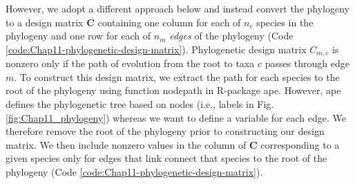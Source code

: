 However, we adopt a different approach below and instead convert the phylogeny to a design matrix \( \mathbf{C} \) containing one column for each of \(n_c\) species in the phylogeny and one row for each of \(n_m\) \textit{edges} of the phylogeny (Code \ref{code:Chap11-phylogenetic-design-matrix}).  Phylogenetic design matrix \(C_{m,c}\) is nonzero only if the path of evolution from the root to taxa \(c\) passes through edge \(m\).  To construct this design matrix, we extract the path for each species to the root of the phylogeny using function \colorbox{backcolour}{nodepath} in R-package \colorbox{backcolour}{ape}\cite{paradis_ape_2019}. However, \colorbox{backcolour}{ape} defines the phylogenetic tree based on nodes (i.e., labels in Fig. \ref{fig:Chap11_phylogeny}) whereas we want to define a variable for each edge.  We therefore remove the root of the phylogeny prior to constructing our design matrix.  We then include nonzero values in the column of \(\mathbf{C}\) corresponding to a given species only for edges that link connect that species to the root of the phylogeny (Code \ref{code:Chap11-phylogenetic-design-matrix}).  

\lstset{style=Rcode}
 

